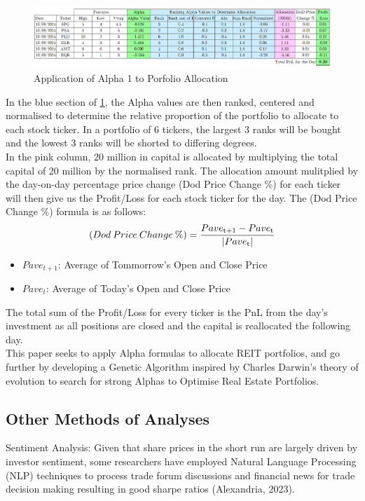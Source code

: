 \documentclass[a4paper,12pt]{report}
\numberwithin{equation}{section}
\theoremstyle{definition}
\begin{document}
\begin{figure}[H]
  \centerline{\includegraphics[width=20cm]{alpha_table}}
  \caption{Application of Alpha 1 to Porfolio Allocation}
  \label{fig:alpha table}
\end{figure}

In the blue section of \ref{fig:alpha table}, the Alpha values are then ranked, centered and normalised to determine the relative proportion of the portfolio to allocate to each stock ticker. In a portfolio of 6 tickers, the largest 3 ranks will be bought and the lowest 3 ranks will be shorted to differing degrees. \\

In the pink column, 20 million in capital is allocated by multiplying the total capital of 20 million by the normalised rank. The allocation amount mulitplied by the day-on-day percentage price change (Dod Price Change \%) for each ticker will then give us the Profit/Loss for each stock ticker for the day. The (Dod Price Change \%) formula is as follows:
\begin{equation*}
  (Dod\:Price\:Change\:\%) = \frac{Pave\textsubscript{t+1}-Pave\textsubscript{t}}{|Pave\textsubscript{t}|}
\end{equation*}

\begin{itemize}
  \item {$Pave_{t+1}$: Average of Tommorrow's Open and Close Price}
  \item {$Pave_{t}$: Average of Today's Open and Close Price}
\end{itemize}

The total sum of the Profit/Loss for every ticker is the PnL from the day's investment as all positions are closed and the capital is reallocated the following day. \\

This paper seeks to apply Alpha formulas to allocate REIT portfolios, and go further by developing a Genetic Algorithm inspired by Charles Darwin's theory of evolution to search for strong Alphas to Optimise Real Estate Portfolios. 

\subsection{Other Methods of Analyses}
Sentiment Analysis: Given that share prices in the short run are largely driven by investor sentiment, some researchers have employed Natural Language Processing (NLP) techniques to process trade forum discussions and financial news for trade decision making resulting in good sharpe ratios (Alexandria, 2023). \\
\end{document}
